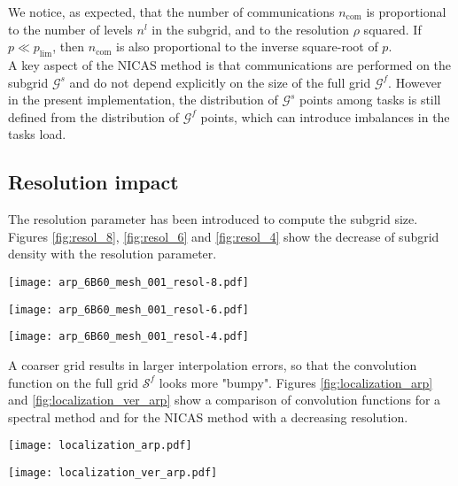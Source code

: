 \documentclass[12pt]{scrartcl}
\begin{document}
We notice, as expected, that the number of communications $n_\mathrm{com}$ is proportional to the number of levels $n^l$ in the subgrid, and to the resolution $\rho$ squared. If $p \ll p_\mathrm{lim}$, then $n_\mathrm{com}$ is also proportional to the inverse square-root of $p$.\\
$  $\\
A key aspect of the NICAS method is that communications are performed on the subgrid $\mathcal{G}^s$ and do not depend explicitly on the size of the full grid $\mathcal{G}^f$. However in the present implementation, the distribution of $\mathcal{G}^s$ points among tasks is still defined from the distribution of $\mathcal{G}^f$ points, which can introduce imbalances in the tasks load.

\subsection{Resolution impact}
The resolution parameter has been introduced to compute the subgrid size. Figures \ref{fig:resol_8}, \ref{fig:resol_6} and \ref{fig:resol_4} show the decrease of subgrid density with the resolution parameter.

\begin{center}
\texttt{[image: arp\_6B60\_mesh\_001\_resol-8.pdf]}
\end{center}
\begin{center}
\texttt{[image: arp\_6B60\_mesh\_001\_resol-6.pdf]}
\end{center}
\begin{center}
\texttt{[image: arp\_6B60\_mesh\_001\_resol-4.pdf]}
\end{center}

A coarser grid results in larger interpolation errors, so that the convolution function on the full grid $\mathcal{S}^f$ looks more "bumpy". Figures \ref{fig:localization_arp} and \ref{fig:localization_ver_arp} show a comparison of convolution functions for a spectral method and for the NICAS method with a decreasing resolution.

\begin{center}
\texttt{[image: localization\_arp.pdf]}
\end{center}
\begin{center}
\texttt{[image: localization\_ver\_arp.pdf]}
\end{center}



\end{document}

